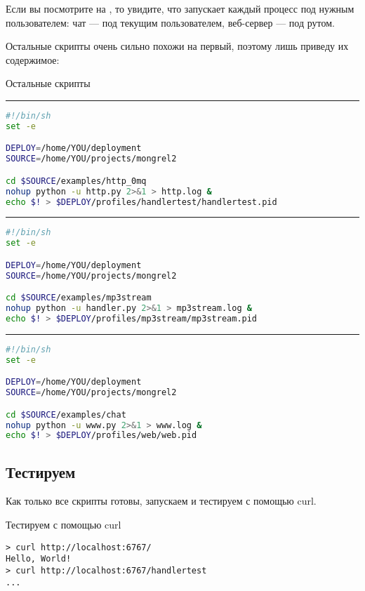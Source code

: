 Если вы посмотрите на , то увидите, что 
запускает каждый процесс под нужным пользователем: чат --- под текущим
пользователем, веб-сервер --- под рутом.

Остальные скрипты очень сильно похожи на первый, поэтому лишь приведу их
содержимое:

\begin{code}{Остальные скрипты}
\hrule

\begin{lstlisting}[language=sh]
#!/bin/sh
set -e

DEPLOY=/home/YOU/deployment
SOURCE=/home/YOU/projects/mongrel2

cd $SOURCE/examples/http_0mq
nohup python -u http.py 2>&1 > http.log &
echo $! > $DEPLOY/profiles/handlertest/handlertest.pid
\end{lstlisting}

\hrule

\begin{lstlisting}[language=sh]
#!/bin/sh
set -e

DEPLOY=/home/YOU/deployment
SOURCE=/home/YOU/projects/mongrel2

cd $SOURCE/examples/mp3stream
nohup python -u handler.py 2>&1 > mp3stream.log &
echo $! > $DEPLOY/profiles/mp3stream/mp3stream.pid
\end{lstlisting}


\hrule
\begin{lstlisting}[language=sh]
#!/bin/sh
set -e

DEPLOY=/home/YOU/deployment
SOURCE=/home/YOU/projects/mongrel2

cd $SOURCE/examples/chat
nohup python -u www.py 2>&1 > www.log &
echo $! > $DEPLOY/profiles/web/web.pid

\end{lstlisting}
\end{code}


\subsection{Тестируем}

Как только все скрипты готовы, запускаем  и тестируем с помощью curl.

\begin{code}{Тестируем с помощью curl}
\begin{lstlisting}
> curl http://localhost:6767/
Hello, World!
> curl http://localhost:6767/handlertest
...
\end{lstlisting}
\end{code}


